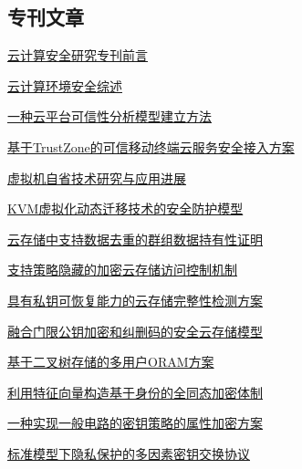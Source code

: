 \documentclass[a4paper]{article}
\begin{document}
\subsection{专刊文章}
\href{http://www.jos.org.cn/ch/reader/download_pdf.aspx?file_no=5010&year_id=2016&quarter_id=6&falg=1}{云计算安全研究专刊前言}

\href{http://www.jos.org.cn/ch/reader/download_pdf.aspx?file_no=5004&year_id=2016&quarter_id=6&falg=1}{云计算环境安全综述}

\href{http://www.jos.org.cn/ch/reader/download_pdf.aspx?file_no=4994&year_id=2016&quarter_id=6&falg=1}{一种云平台可信性分析模型建立方法}

\href{http://www.jos.org.cn/ch/reader/download_pdf.aspx?file_no=5000&year_id=2016&quarter_id=6&falg=1}{基于TrustZone的可信移动终端云服务安全接入方案}

\href{http://www.jos.org.cn/ch/reader/download_pdf.aspx?file_no=5006&year_id=2016&quarter_id=6&falg=1}{虚拟机自省技术研究与应用进展}

\href{http://www.jos.org.cn/ch/reader/download_pdf.aspx?file_no=5009&year_id=2016&quarter_id=6&falg=1}{KVM虚拟化动态迁移技术的安全防护模型}

\href{http://www.jos.org.cn/ch/reader/download_pdf.aspx?file_no=4995&year_id=2016&quarter_id=6&falg=1}{云存储中支持数据去重的群组数据持有性证明}

\href{http://www.jos.org.cn/ch/reader/download_pdf.aspx?file_no=5003&year_id=2016&quarter_id=6&falg=1}{支持策略隐藏的加密云存储访问控制机制}

\href{http://www.jos.org.cn/ch/reader/download_pdf.aspx?file_no=4999&year_id=2016&quarter_id=6&falg=1}{具有私钥可恢复能力的云存储完整性检测方案}

\href{http://www.jos.org.cn/ch/reader/download_pdf.aspx?file_no=5008&year_id=2016&quarter_id=6&falg=1}{融合门限公钥加密和纠删码的安全云存储模型}

\href{http://www.jos.org.cn/ch/reader/download_pdf.aspx?file_no=5002&year_id=2016&quarter_id=6&falg=1}{基于二叉树存储的多用户ORAM方案}

\href{http://www.jos.org.cn/ch/reader/download_pdf.aspx?file_no=4991&year_id=2016&quarter_id=6&falg=1}{利用特征向量构造基于身份的全同态加密体制}

\href{http://www.jos.org.cn/ch/reader/download_pdf.aspx?file_no=4993&year_id=2016&quarter_id=6&falg=1}{一种实现一般电路的密钥策略的属性加密方案}

\href{http://www.jos.org.cn/ch/reader/download_pdf.aspx?file_no=5001&year_id=2016&quarter_id=6&falg=1}{标准模型下隐私保护的多因素密钥交换协议}
\end{document}
